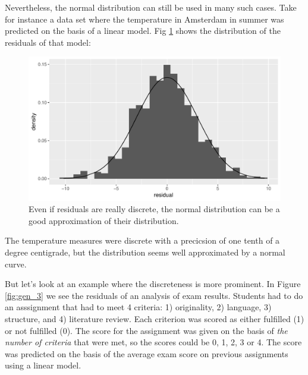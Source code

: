 \documentclass[]{book}\usepackage[]{graphicx}\usepackage[]{color}
\makeatletter
\def\maxwidth{ %
  \ifdim\Gin@nat@width>\linewidth
    \linewidth
  \else
    \Gin@nat@width
  \fi
}
\newenvironment{knitrout}{}{} %
\makeatother
\begin{document}
Nevertheless, the normal distribution can still be used in many such cases. Take for instance a data set where the temperature in Amsterdam in summer was predicted on the basis of a linear model. Fig \ref{fig:gen_2} shows the distribution of the residuals of that model:
% 
\begin{knitrout}
\color{fgcolor}\begin{figure}

{\centering \includegraphics[width=\maxwidth]{figure/gen_2-1} 

}

\caption[Even if residuals are really discrete, the normal distribution can be a good approximation of their distribution]{Even if residuals are really discrete, the normal distribution can be a good approximation of their distribution.}\label{fig:gen_2}
\end{figure}


\end{knitrout}


The temperature measures were discrete with a precicsion of one tenth of a degree centigrade, but the distribution seems well approximated by a normal curve.


But let's look at an example where the discreteness is more prominent. In Figure \ref{fig:gen_3} we see the residuals of an analysis of exam results. Students had to do an asssignment that had to meet 4 criteria: 1) originality, 2) language, 3) structure, and 4) literature review. Each criterion was scored as either fulfilled (1) or not fulfilled (0). The score for the assignment was given on the basis of \textit{the number of criteria} that were met, so the scores could be 0, 1, 2, 3 or 4. The score was predicted on the basis of the average exam score on previous assignments using a linear model.
\end{document}
